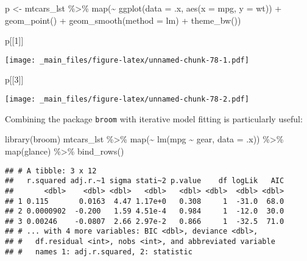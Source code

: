 \documentclass[
]{book}
\newenvironment{Shaded}{\begin{snugshade}}{\end{snugshade}}
\newcommand{\AttributeTok}[1]{\textcolor[rgb]{0.77,0.63,0.00}{#1}}
\newcommand{\DecValTok}[1]{\textcolor[rgb]{0.00,0.00,0.81}{#1}}
\newcommand{\FunctionTok}[1]{\textcolor[rgb]{0.00,0.00,0.00}{#1}}
\newcommand{\NormalTok}[1]{#1}
\newcommand{\OtherTok}[1]{\textcolor[rgb]{0.56,0.35,0.01}{#1}}
\newcommand{\SpecialCharTok}[1]{\textcolor[rgb]{0.00,0.00,0.00}{#1}}
\newcommand{\StringTok}[1]{\textcolor[rgb]{0.31,0.60,0.02}{#1}}
\begin{document}
\begin{Shaded}
\begin{Highlighting}[]
\NormalTok{p }\OtherTok{\textless{}{-}}\NormalTok{ mtcars\_lst }\SpecialCharTok{\%\textgreater{}\%} \FunctionTok{map}\NormalTok{(}\SpecialCharTok{\textasciitilde{}} \FunctionTok{ggplot}\NormalTok{(}\AttributeTok{data =}\NormalTok{ .x, }\FunctionTok{aes}\NormalTok{(}\AttributeTok{x =}\NormalTok{ mpg, }\AttributeTok{y =}\NormalTok{ wt)) }\SpecialCharTok{+} 
                          \FunctionTok{geom\_point}\NormalTok{() }\SpecialCharTok{+} \FunctionTok{geom\_smooth}\NormalTok{(}\AttributeTok{method =} \StringTok{\textquotesingle{}lm\textquotesingle{}}\NormalTok{) }\SpecialCharTok{+} 
                          \FunctionTok{theme\_bw}\NormalTok{())}

\NormalTok{p[[}\DecValTok{1}\NormalTok{]]}
\end{Highlighting}
\end{Shaded}

\texttt{[image: \_main\_files/figure-latex/unnamed-chunk-78-1.pdf]}

\begin{Shaded}
\begin{Highlighting}[]
\NormalTok{p[[}\DecValTok{3}\NormalTok{]]}
\end{Highlighting}
\end{Shaded}

\texttt{[image: \_main\_files/figure-latex/unnamed-chunk-78-2.pdf]}

Combining the package \texttt{broom} with iterative model fitting is particularly useful:

\begin{Shaded}
\begin{Highlighting}[]
\FunctionTok{library}\NormalTok{(broom)}
\NormalTok{mtcars\_lst }\SpecialCharTok{\%\textgreater{}\%}
  \FunctionTok{map}\NormalTok{(}\SpecialCharTok{\textasciitilde{}} \FunctionTok{lm}\NormalTok{(mpg }\SpecialCharTok{\textasciitilde{}}\NormalTok{ gear, }\AttributeTok{data =}\NormalTok{ .x)) }\SpecialCharTok{\%\textgreater{}\%}
  \FunctionTok{map}\NormalTok{(glance) }\SpecialCharTok{\%\textgreater{}\%}
  \FunctionTok{bind\_rows}\NormalTok{()}
\end{Highlighting}
\end{Shaded}

\begin{verbatim}
## # A tibble: 3 x 12
##   r.squared adj.r.~1 sigma stati~2 p.value    df logLik   AIC
##       <dbl>    <dbl> <dbl>   <dbl>   <dbl> <dbl>  <dbl> <dbl>
## 1 0.115       0.0163  4.47 1.17e+0   0.308     1  -31.0  68.0
## 2 0.0000902  -0.200   1.59 4.51e-4   0.984     1  -12.0  30.0
## 3 0.00246    -0.0807  2.66 2.97e-2   0.866     1  -32.5  71.0
## # ... with 4 more variables: BIC <dbl>, deviance <dbl>,
## #   df.residual <int>, nobs <int>, and abbreviated variable
## #   names 1: adj.r.squared, 2: statistic
\end{verbatim}
\end{document}

